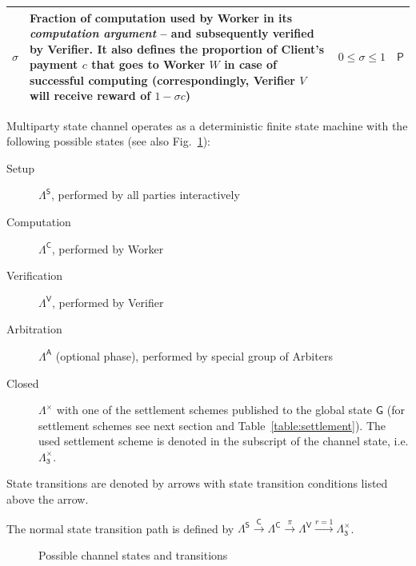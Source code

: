 \documentclass[a4paper]{article}
\begin{document}
\begin{table}[hp]
\begin{adjustbox}{center}
\begin{tabular}{@{} l m{11cm} m{2.5cm} c @{}}
            $\sigma$ & Fraction of computation used by Worker in its \textit{computation argument} -- and subsequently verified by Verifier. It also defines the proportion of Client's payment $c$ that goes to Worker $W$ in case of successful computing (correspondingly, Verifier $V$ will receive reward of $1-\sigma c$) & $0 \le \sigma \le 1$ & $\mathsf{P}$ \\
            \bottomrule
        \end{tabular}
    \end{adjustbox}
\end{table}

Multiparty state channel operates as a deterministic finite state machine with the following possible states (see also Fig.~\ref{fig:states}):
\begin{description}
    \item[Setup] $\Lambda^\mathsf{S}$, performed by all parties interactively
    \item[Computation] $\Lambda^\mathsf{C}$, performed by Worker
    \item[Verification] $\Lambda^\mathsf{V}$, performed by Verifier
    \item[Arbitration] $\Lambda^\mathsf{A}$ (optional phase), performed by special group of Arbiters
    \item[Closed] $\Lambda^\mathsf{\times}$ with one of the settlement schemes published to the global state $\mathsf{G}$ (for settlement schemes see next section and Table~\ref{table:settlement}). The used settlement scheme is denoted in the subscript of the channel state, i.e. $\Lambda^\mathsf{\times}_\mathtt{3}$.
\end{description}

State transitions are denoted by arrows with state transition conditions listed above the arrow.

The normal state transition path is defined by $\Lambda^\mathsf{S} \xrightarrow{\mathsf{C}} \Lambda^\mathsf{C} \xrightarrow{\pi} \Lambda^\mathsf{V} \xrightarrow{r=1} \Lambda^\mathsf{\times}_\mathtt{3}$.

\begin{figure}[h!]
    \centering
    \begin{adjustbox}{center}\end{adjustbox}
    \caption{Possible channel states and transitions}
    \label{fig:states}
\end{figure}
\end{document}

